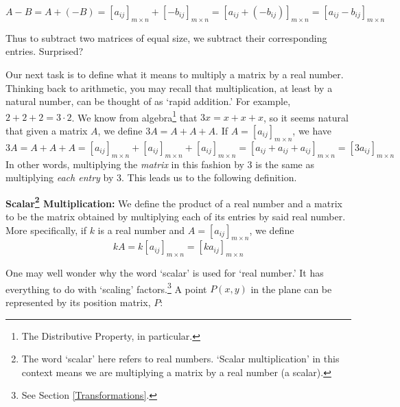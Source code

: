 \[A-B = A + (-B) = \left[a_{ij}\right]_{m \times n} + \left[-b_{ij}\right]_{m \times n} = \left[a_{ij} + \left(-b_{ij}\right) \right]_{m \times n} = \left[a_{ij} - b_{ij} \right]_{m \times n}\]

Thus to subtract two matrices of equal size, we subtract their corresponding entries.  Surprised?


\smallskip
Our next task is to define what it means to multiply a matrix by a real number.  Thinking back to arithmetic,  you may recall that multiplication, at least by a natural number, can be thought of as `rapid addition.' For example,  $2+2+2 = 3 \cdot 2$.  We know from algebra\footnote{The Distributive Property, in particular.} that $3x = x + x + x$, so it seems natural that given a matrix $A$, we define $3A = A + A + A$.  If $A =\left[a_{ij}\right]_{m \times n}$, we have \[3A = A + A + A = \left[a_{ij}\right]_{m \times n} + \left[a_{ij}\right]_{m \times n} + \left[a_{ij}\right]_{m \times n} = \left[a_{ij} + a_{ij} + a_{ij} \right]_{m \times n} = \left[ 3a_{ij}\right]_{m \times n} \]  In other words, multiplying the \textit{matrix} in this fashion by $3$ is the same as multiplying \textit{each entry} by $3$.  This leads us to the following definition.  

\smallskip

\colorbox{ResultColor}{\bbm

\begin{defn} \label{scalarmultmatrix}  \textbf{Scalar\footnote{The word `scalar' here refers to real numbers.  `Scalar multiplication' in this context means we are multiplying a matrix by a real number (a scalar).} Multiplication:} We define the product of a real number and a matrix to be the matrix obtained by multiplying each of its entries by said real number.  More specifically, if $k$ is a real number and $A = \left[a_{ij}\right]_{m \times n}$, we define \[kA = k\left[a_{ij}\right]_{m \times n} = \left[ka_{ij}\right]_{m \times n}\]

\end{defn}

\ebm}

\smallskip


One may well wonder why the word `scalar' is used for `real number.'  It has everything to do with `scaling' factors.\footnote{See Section \ref{Transformations}.}  A point $P(x,y)$ in the plane can be represented by its position matrix, $P$:

